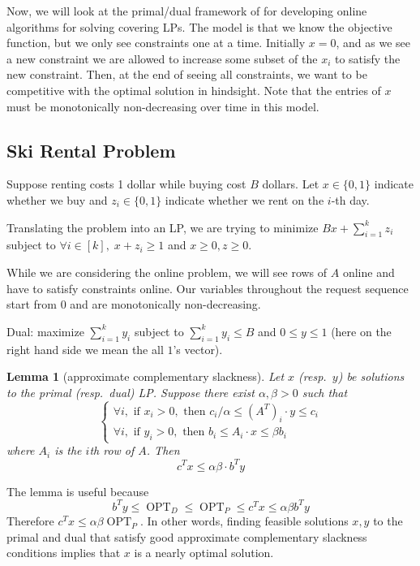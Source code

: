 \documentclass[11pt]{article}
\newtheorem{lemma}[theorem]{Lemma}
\DeclareMathOperator{\opt}{OPT}
\begin{document}
Now, we will look at the primal/dual framework of \cite{buchbinder2005online} for developing online algorithms for solving covering LPs. The model is that we know the objective function, but we only see constraints one at a time. Initially $x = 0$, and as we see a new constraint we are allowed to increase some subset of the $x_i$ to satisfy the new constraint. Then, at the end of seeing all constraints, we want to be competitive with the optimal solution in hindsight. Note that the entries of $x$ must be monotonically non-decreasing over time in this model.

\subsection{Ski Rental Problem}
Suppose renting costs 1 dollar while buying cost $B$ dollars.
Let $x\in\{0, 1\}$ indicate whether we buy and $z_i\in\{0, 1\}$ indicate whether we rent on the $i$-th day.

Translating the problem into an LP, we are trying to minimize $Bx + \sum_{i = 1}^kz_i$ subject to
$\forall i\in[k],\; x + z_i \geq 1$ and $x \geq 0, z\geq 0$.

While we are considering the online problem, we will see rows of $A$ online and have to satisfy constraints online.
Our variables throughout the request sequence start from 0 and are monotonically non-decreasing.

Dual: maximize $\sum_{i = 1}^k y_i$ subject to $\sum_{i = 1}^k y_i \leq B$ and $0\le y\le 1$ (here on the right hand side we mean the all $1$'s vector).

\begin{lemma}[approximate complementary slackness]
Let $x$ (resp.\ $y$) be solutions to the primal (resp.\ dual) LP.
Suppose there exist $\alpha, \beta > 0$ such that
\[\begin{cases}
\forall i, \mbox{ if } x_i > 0, \mbox{ then } c_i/\alpha \leq (A^T)_i \cdot y \leq c_i\\
\forall i, \mbox{ if } y_i > 0, \mbox{ then } b_i \leq A_i \cdot x \leq \beta b_i
\end{cases}\]
where $A_i$ is the $i$th row of $A$. Then
\[c^Tx \leq \alpha\beta \cdot b^T y\]
\end{lemma}
The lemma is useful because
\[b^Ty \leq \opt_D \leq \opt_P \leq c^Tx \leq \alpha\beta b^Ty\]
Therefore $c^T x \le \alpha\beta\opt_P$. In other words, finding feasible solutions $x,y$ to the primal and dual that satisfy good approximate complementary slackness conditions implies that $x$ is a nearly optimal solution.
\end{document}
